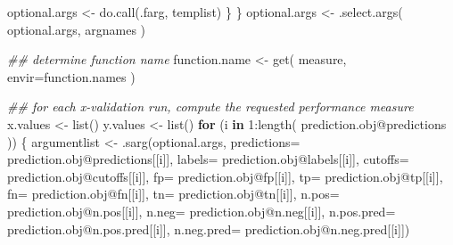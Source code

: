 \documentclass[
  letterpaper,
  DIV=11,
  numbers=noendperiod]{scrartcl}
\newenvironment{Shaded}{\begin{snugshade}}{\end{snugshade}}
\newcommand{\AttributeTok}[1]{\textcolor[rgb]{0.40,0.45,0.13}{#1}}
\newcommand{\ControlFlowTok}[1]{\textcolor[rgb]{0.00,0.23,0.31}{\textbf{#1}}}
\newcommand{\DecValTok}[1]{\textcolor[rgb]{0.68,0.00,0.00}{#1}}
\newcommand{\DocumentationTok}[1]{\textcolor[rgb]{0.37,0.37,0.37}{\textit{#1}}}
\newcommand{\FunctionTok}[1]{\textcolor[rgb]{0.28,0.35,0.67}{#1}}
\newcommand{\NormalTok}[1]{\textcolor[rgb]{0.00,0.23,0.31}{#1}}
\newcommand{\OtherTok}[1]{\textcolor[rgb]{0.00,0.23,0.31}{#1}}
\newcommand{\SpecialCharTok}[1]{\textcolor[rgb]{0.37,0.37,0.37}{#1}}
\newcommand{\StringTok}[1]{\textcolor[rgb]{0.13,0.47,0.30}{#1}}
\begin{document}
\begin{Shaded}
\begin{Highlighting}[]
\NormalTok{                optional.args }\OtherTok{\textless{}{-}} \FunctionTok{do.call}\NormalTok{(}\StringTok{\textquotesingle{}.farg\textquotesingle{}}\NormalTok{, templist)}
\NormalTok{            \}}
\NormalTok{        \}}
\NormalTok{        optional.args }\OtherTok{\textless{}{-}} \FunctionTok{.select.args}\NormalTok{( optional.args, argnames )}
        
        \DocumentationTok{\#\# determine function name}
\NormalTok{        function.name }\OtherTok{\textless{}{-}} \FunctionTok{get}\NormalTok{( measure, }\AttributeTok{envir=}\NormalTok{function.names )}

        \DocumentationTok{\#\# for each x{-}validation run, compute the requested performance measure}
\NormalTok{        x.values }\OtherTok{\textless{}{-}} \FunctionTok{list}\NormalTok{()}
\NormalTok{        y.values }\OtherTok{\textless{}{-}} \FunctionTok{list}\NormalTok{()}
        \ControlFlowTok{for}\NormalTok{ (i }\ControlFlowTok{in} \DecValTok{1}\SpecialCharTok{:}\FunctionTok{length}\NormalTok{( prediction.obj}\SpecialCharTok{@}\NormalTok{predictions )) \{}
\NormalTok{            argumentlist }\OtherTok{\textless{}{-}} \FunctionTok{.sarg}\NormalTok{(optional.args,}
                                  \AttributeTok{predictions=}\NormalTok{ prediction.obj}\SpecialCharTok{@}\NormalTok{predictions[[i]],}
                                  \AttributeTok{labels=}\NormalTok{ prediction.obj}\SpecialCharTok{@}\NormalTok{labels[[i]],}
                                  \AttributeTok{cutoffs=}\NormalTok{ prediction.obj}\SpecialCharTok{@}\NormalTok{cutoffs[[i]],}
                                  \AttributeTok{fp=}\NormalTok{ prediction.obj}\SpecialCharTok{@}\NormalTok{fp[[i]],}
                                  \AttributeTok{tp=}\NormalTok{ prediction.obj}\SpecialCharTok{@}\NormalTok{tp[[i]],}
                                  \AttributeTok{fn=}\NormalTok{ prediction.obj}\SpecialCharTok{@}\NormalTok{fn[[i]],}
                                  \AttributeTok{tn=}\NormalTok{ prediction.obj}\SpecialCharTok{@}\NormalTok{tn[[i]],}
                                  \AttributeTok{n.pos=}\NormalTok{ prediction.obj}\SpecialCharTok{@}\NormalTok{n.pos[[i]],}
                                  \AttributeTok{n.neg=}\NormalTok{ prediction.obj}\SpecialCharTok{@}\NormalTok{n.neg[[i]],}
                                  \AttributeTok{n.pos.pred=}\NormalTok{ prediction.obj}\SpecialCharTok{@}\NormalTok{n.pos.pred[[i]],}
                                  \AttributeTok{n.neg.pred=}\NormalTok{ prediction.obj}\SpecialCharTok{@}\NormalTok{n.neg.pred[[i]])}


\end{Highlighting}
\end{Shaded}
\end{document}
